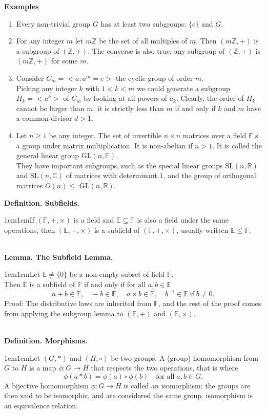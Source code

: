 \documentclass{article}
\newcommand{\definition}[2]{\textbf{Definition. #1.}\begin{adjustwidth}{1cm}{1cm}#2\end{adjustwidth}}
\newcommand{\lemma}[2]{\textbf{Lemma. #1.}\begin{adjustwidth}{1cm}{1cm}#2\end{adjustwidth}}
\begin{document}
\textbf{Examples}\begin{enumerate}
  \item Every non-trivial group $G$ has at least two subgroups: $\{e\}$ and $G$.
  \item For any integer $m$ let $m\mathbb{Z}$ be the set of all multiples of $m$. Then $(m\mathbb{Z}, +)$ is a subgroup of $(\mathbb{Z}, +)$. The converse is also true; any subgroup of $(\mathbb{Z}, +)$ is $(m\mathbb{Z}, +)$ for some $m$.
  \item Consider $C_m = <a : a^m = e>$ the cyclic group of order $m$.\\Picking any integer $k$ with $1 < k < m$ we could generate a subgroup $H_k = <a^k>$ of $C_m$ by looking at all powers of $a_k$. Clearly, the order of $H_k$ cannot be larger than $m$; it is strictly less than $m$ if and only if $k$ and $m$ have a common divisor $d > 1$.
  \item Let $n \geq 1$ be any integer. The set of invertible $n \times n$ matrices over a field $\mathbb{F}$ s a group under matrix multiplication. It is non-abelian if $n > 1$. It is called the general linear group GL$(n, \mathbb{F})$.\\They have important subgroups, such as the special linear groups SL$(n,\mathbb{R})$ and SL$(n, \mathbb{C})$ of matrices with determinant $1$, and the group of orthogonal matrices $O(n) \leq$ GL$(n, \mathbb{R})$.
\end{enumerate}\newpage
\definition{Subfields}{If $(\mathbb{F}, +, \times)$ is a field and $\mathbb{E} \subseteq \mathbb{F}$ is also a field under the same operations, then $(\mathbb{E}, +, \times)$ is a subfield of $(\mathbb{F}, +, \times)$, usually written $\mathbb{E} \leq \mathbb{F}$.}~\\
\lemma{The Subfield Lemma}{Let $\mathbb{E} \neq \{0\}$ be a non-empty subset of field $\mathbb{F}$.\\Then $\mathbb{E}$ is a subfield of $\mathbb{F}$ if and only if for all $a,b \in \mathbb{E}$ \[a + b \in \mathbb{E}, \quad -b \in \mathbb{E}, \quad a \times b \in \mathbb{E}, \quad b^{-1} \in \mathbb{E} \; \text{if} \; b \neq 0.\]Proof: The distributive laws are inherited from $\mathbb{F}$, and the rest of the proof comes from applying the subgroup lemma to $(\mathbb{E}, +)$ and $(\mathbb{E}, \times)$.}~\\
\definition{Morphisms}{Let $(G, *)$ and $(H, \circ)$ be two groups. A (group) homomorphism from $G$ to $H$ is a map $\phi : G \rightarrow H$ that respects the two operations, that is where \[\phi(a * b) = \phi(a) \circ \phi(b) \quad \text{for all} \; a,b \in G.\]A bijective homomorphism $\phi: G \rightarrow H$ is called an isomorphism; the groups are then said to be isomorphic, and are considered the same group. isomorphism is an equivalence relation.}~\\
\end{document}
